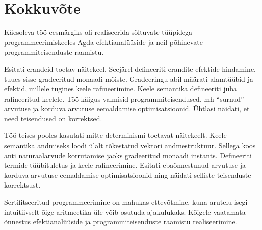 \documentclass[a4paper,12pt]{article}
\begin{document}
\fi

\clearpage\vspace*{0pt}


\section{Kokkuvõte}

Käesoleva töö eesmärgiks oli realiseerida sõltuvate tüüpidega programmeerimiskeeles Agda efektianalüüside ja neil põhinevate programmiteisenduste raamistu.

Esitati erandeid toetav näitekeel.
Seejärel defineeriti erandite efektide hindamine, tuues sisse gradeeritud monaadi mõiste.
Gradeeringu abil määrati alamtüübid ja -efektid, millele tugines keele rafineerimine.
Keele semantika defineeriti juba rafineeritud keelele.
Töö käigus valmisid programmiteisendused, mh ``surnud'' arvutuse ja korduva arvutuse eemaldamise optimisatsioonid.
Ühtlasi näidati, et need teisendused on korrektsed.

Töö teises pooles kasutati mitte-determinismi toetavat näitekeelt.
Keele semantika andmiseks loodi ülalt tõkestatud vektori andmestruktuur.
Sellega koos anti naturaalarvude korrutamise jaoks gradeeritud monaadi instants.
Defineeriti termide tüübituletus ja keele rafineerimine.
Esitati ebaõnnestunud arvutuse ja korduva arvutuse eemaldamise optimisatsioonid ning näidati selliste teisenduste korrektsust.

Sertifitseeritud programmeerimine on mahukas ettevõtmine, kuna arutelu isegi intuitiivselt õige aritmeetika üle võib osutuda ajakulukaks.
Kõigele vaatamata õnnestus efektianalüüside ja programmiteisenduste raamistu realiseerimine.

\clearpage\vspace*{0pt}

\renewcommand{\baselinestretch}{1.15}
\small


\end{document}
